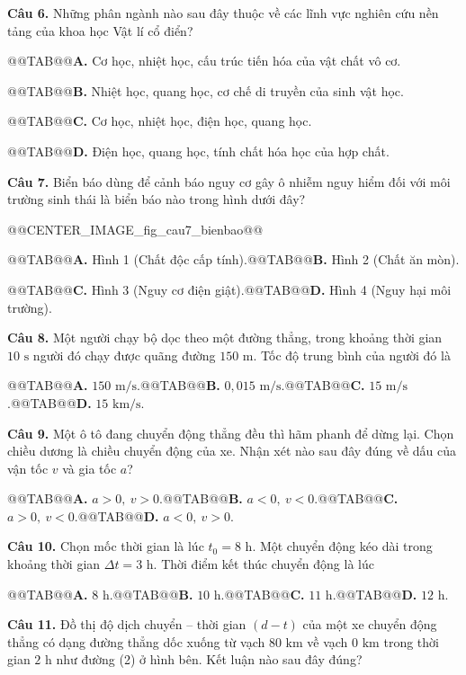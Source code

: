 \documentclass{article}
\begin{document}
\textbf{Câu 6.} Những phân ngành nào sau đây thuộc về các lĩnh vực nghiên cứu nền tảng của khoa học Vật lí cổ điển?

@@TAB@@\textbf{A.} Cơ học, nhiệt học, cấu trúc tiến hóa của vật chất vô cơ.

@@TAB@@\textbf{B.} Nhiệt học, quang học, cơ chế di truyền của sinh vật học.

@@TAB@@\textbf{C.} Cơ học, nhiệt học, điện học, quang học.

@@TAB@@\textbf{D.} Điện học, quang học, tính chất hóa học của hợp chất.

\textbf{Câu 7.} Biển báo dùng để cảnh báo nguy cơ gây ô nhiễm nguy hiểm đối với môi trường sinh thái là biển báo nào trong hình dưới đây?

@@CENTER_IMAGE_fig_cau7_bienbao@@

@@TAB@@\textbf{A.} Hình 1 (Chất độc cấp tính).@@TAB@@\textbf{B.} Hình 2 (Chất ăn mòn).

@@TAB@@\textbf{C.} Hình 3 (Nguy cơ điện giật).@@TAB@@\textbf{D.} Hình 4 (Nguy hại môi trường).

\textbf{Câu 8.} Một người chạy bộ dọc theo một đường thẳng, trong khoảng thời gian $10\text{ s}$ người đó chạy được quãng đường $150\text{ m}$. Tốc độ trung bình của người đó là

@@TAB@@\textbf{A.} $150\text{ m/s}$.@@TAB@@\textbf{B.} $0{,}015\text{ m/s}$.@@TAB@@\textbf{C.} $15\text{ m/s}$.@@TAB@@\textbf{D.} $15\text{ km/s}$.

\textbf{Câu 9.} Một ô tô đang chuyển động thẳng đều thì hãm phanh để dừng lại. Chọn chiều dương là chiều chuyển động của xe. Nhận xét nào sau đây đúng về dấu của vận tốc $v$ và gia tốc $a$?

@@TAB@@\textbf{A.} $a > 0,\ v > 0$.@@TAB@@\textbf{B.} $a < 0,\ v < 0$.@@TAB@@\textbf{C.} $a > 0,\ v < 0$.@@TAB@@\textbf{D.} $a < 0,\ v > 0$.

\textbf{Câu 10.} Chọn mốc thời gian là lúc $t_0 = 8\text{ h}$. Một chuyển động kéo dài trong khoảng thời gian $\Delta t = 3\text{ h}$. Thời điểm kết thúc chuyển động là lúc

@@TAB@@\textbf{A.} $8\text{ h}$.@@TAB@@\textbf{B.} $10\text{ h}$.@@TAB@@\textbf{C.} $11\text{ h}$.@@TAB@@\textbf{D.} $12\text{ h}$.

\textbf{Câu 11.} Đồ thị độ dịch chuyển -- thời gian $(d - t)$ của một xe chuyển động thẳng có dạng đường thẳng dốc xuống từ vạch $80\text{ km}$ về vạch $0\text{ km}$ trong thời gian $2\text{ h}$ như đường (2) ở hình bên. Kết luận nào sau đây đúng?
\end{document}
